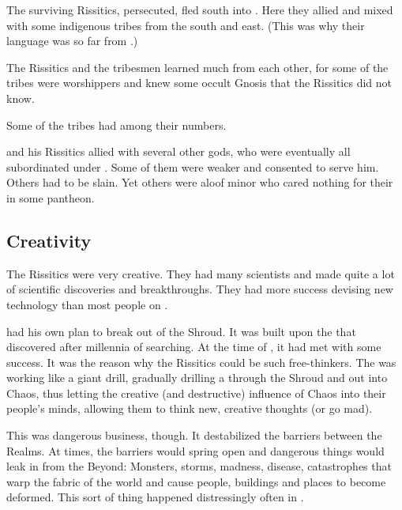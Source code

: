 The surviving Rissitics, persecuted, fled south into \Durcac. 
Here they allied and mixed with some indigenous tribes from the south and east. 
(This was why their language was so far from \Ortaican.)

The Rissitics and the tribesmen learned much from each other, for some of the tribes were \xs{} worshippers and knew some occult Gnosis that the Rissitics did not know. 

Some of the tribes had  among their numbers. 

\Secherdamon{} and his Rissitics allied with several other gods, who were eventually all subordinated under \Secherdamon. 
Some of them were weaker and consented to serve him. 
Others had to be slain. 
Yet others were aloof minor \xss{} who cared nothing for their  in some \Miithian{} pantheon.





\subsection{Creativity}
The Rissitics were very creative. 
They had many scientists and made quite a lot of scientific discoveries and breakthroughs. 
They had more success devising new technology than most people on \Miith{} . 

\Secherdamon{} had his own plan to break out of the Shroud. 
It was built upon the  that \Secherdamon{} discovered after millennia of searching. 
At the time of , it had met with some success. 
It was the reason why the Rissitics could be such free-thinkers. 
The  was working like a giant drill, gradually drilling a  through the Shroud and out into Chaos, thus letting the creative (and destructive) influence of Chaos into their people's minds, allowing them to think new, creative thoughts (or go mad). 

This  was dangerous business, though. 
It destabilized the barriers between the Realms. 
At times, the barriers would spring open and dangerous things would leak in from the Beyond: 
Monsters, storms, madness, disease, catastrophes that warp the fabric of the world and cause people, buildings and places to become deformed. 
This sort of thing happened distressingly often in \Durcac. 


